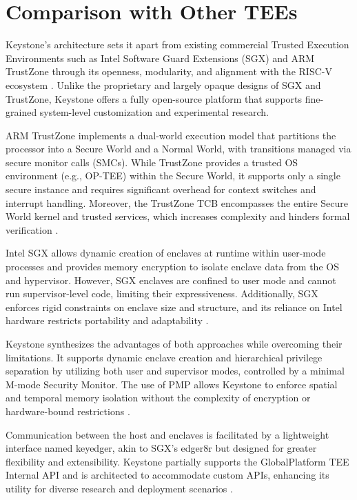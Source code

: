 \section{Comparison with Other TEEs}
\label{sec:comparison_tees}

Keystone’s architecture sets it apart from existing commercial Trusted Execution Environments such as Intel Software Guard Extensions (SGX) and ARM TrustZone through its openness, modularity, and alignment with the RISC-V ecosystem \cite{dayeol2019keystone}. Unlike the proprietary and largely opaque designs of SGX and TrustZone, Keystone offers a fully open-source platform that supports fine-grained system-level customization and experimental research.

ARM TrustZone implements a dual-world execution model that partitions the processor into a Secure World and a Normal World, with transitions managed via secure monitor calls (SMCs). While TrustZone provides a trusted OS environment (e.g., OP-TEE) within the Secure World, it supports only a single secure instance and requires significant overhead for context switches and interrupt handling. Moreover, the TrustZone TCB encompasses the entire Secure World kernel and trusted services, which increases complexity and hinders formal verification \cite{dayeol2019keystone}.

Intel SGX allows dynamic creation of enclaves at runtime within user-mode processes and provides memory encryption to isolate enclave data from the OS and hypervisor. However, SGX enclaves are confined to user mode and cannot run supervisor-level code, limiting their expressiveness. Additionally, SGX enforces rigid constraints on enclave size and structure, and its reliance on Intel hardware restricts portability and adaptability \cite{dayeol2019keystone}.

Keystone synthesizes the advantages of both approaches while overcoming their limitations. It supports dynamic enclave creation and hierarchical privilege separation by utilizing both user and supervisor modes, controlled by a minimal M-mode Security Monitor. The use of PMP allows Keystone to enforce spatial and temporal memory isolation without the complexity of encryption or hardware-bound restrictions \cite{dayeol2019keystone}.

Communication between the host and enclaves is facilitated by a lightweight interface named keyedger, akin to SGX’s edger8r but designed for greater flexibility and extensibility. Keystone partially supports the GlobalPlatform TEE Internal API and is architected to accommodate custom APIs, enhancing its utility for diverse research and deployment scenarios \cite{dayeol2019keystone}.

